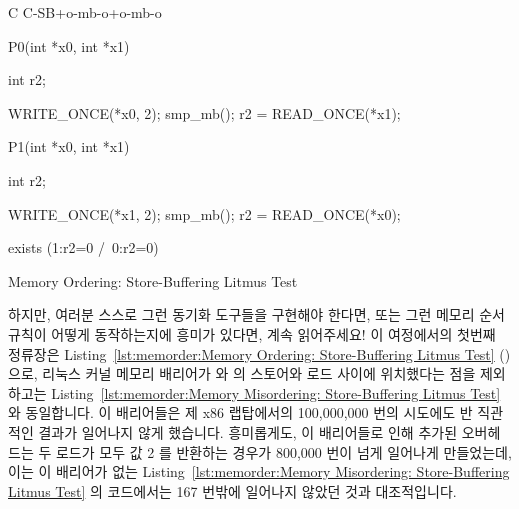 \begin{listing}[tbp]
{ \scriptsize
\begin{verbbox}[\LstLineNo]
C C-SB+o-mb-o+o-mb-o
{
}

P0(int *x0, int *x1)
{
  int r2;

  WRITE_ONCE(*x0, 2);
  smp_mb();
  r2 = READ_ONCE(*x1);
}


P1(int *x0, int *x1)
{
  int r2;

  WRITE_ONCE(*x1, 2);
  smp_mb();
  r2 = READ_ONCE(*x0);
}

exists (1:r2=0 /\ 0:r2=0)
\end{verbbox}
}
\centering
\theverbbox
\caption{Memory Ordering: Store-Buffering Litmus Test}
\label{lst:memorder:Memory Ordering: Store-Buffering Litmus Test}
\end{listing}

하지만, 여러분 스스로 그런 동기화 도구들을 구현해야 한다면, 또는 그런 메모리
순서 규칙이 어떻게 동작하는지에 흥미가 있다면, 계속 읽어주세요!
이 여정에서의 첫번째 정류장은
Listing~\ref{lst:memorder:Memory Ordering: Store-Buffering Litmus Test}
() 으로,  리눅스 커널 메모리
배리어가  와  의 스토어와 로드 사이에 위치했다는 점을
제외하고는
Listing~\ref{lst:memorder:Memory Misordering: Store-Buffering Litmus Test}
와 동일합니다.
이 배리어들은 제 x86 랩탑에서의 100,000,000 번의 시도에도 반 직관적인 결과가
일어나지 않게 했습니다.
흥미롭게도, 이 배리어들로 인해 추가된 오버헤드는 두 로드가 모두 값 2 를
반환하는 경우가 800,000 번이 넘게 일어나게 만들었는데, 이는 이 배리어가 없는
Listing~\ref{lst:memorder:Memory Misordering: Store-Buffering Litmus Test} 의
코드에서는 167 번밖에 일어나지 않았던 것과 대조적입니다.

